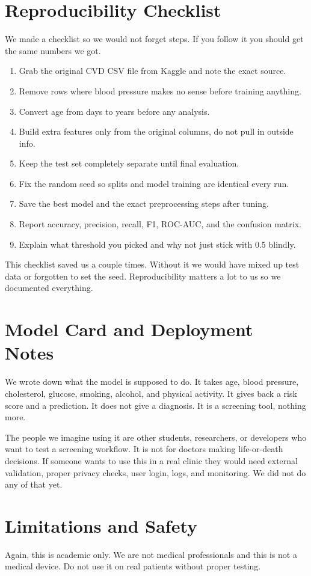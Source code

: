 \documentclass[12pt, a4paper, oneside]{book}
\begin{document}
\section{Reproducibility Checklist}
We made a checklist so we would not forget steps. If you follow it you should get the same numbers we got.

\begin{enumerate}
  \item Grab the original CVD CSV file from Kaggle and note the exact source.
  \item Remove rows where blood pressure makes no sense before training anything.
  \item Convert age from days to years before any analysis.
  \item Build extra features only from the original columns, do not pull in outside info.
  \item Keep the test set completely separate until final evaluation.
  \item Fix the random seed so splits and model training are identical every run.
  \item Save the best model and the exact preprocessing steps after tuning.
  \item Report accuracy, precision, recall, F1, ROC-AUC, and the confusion matrix.
  \item Explain what threshold you picked and why not just stick with 0.5 blindly.
\end{enumerate}

This checklist saved us a couple times. Without it we would have mixed up test data or forgotten to set the seed. Reproducibility matters a lot to us so we documented everything.

\section{Model Card and Deployment Notes}
We wrote down what the model is supposed to do. It takes age, blood pressure, cholesterol, glucose, smoking, alcohol, and physical activity. It gives back a risk score and a prediction. It does not give a diagnosis. It is a screening tool, nothing more.

The people we imagine using it are other students, researchers, or developers who want to test a screening workflow. It is not for doctors making life-or-death decisions. If someone wants to use this in a real clinic they would need external validation, proper privacy checks, user login, logs, and monitoring. We did not do any of that yet.

\section{Limitations and Safety}
Again, this is academic only. We are not medical professionals and this is not a medical device. Do not use it on real patients without proper testing.
\end{document}
